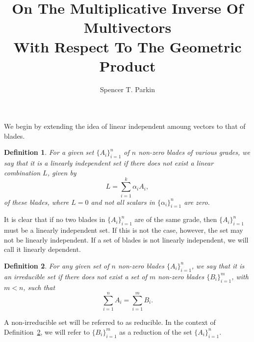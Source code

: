 \documentclass[12pt]{article}
\title{On The Multiplicative Inverse Of Multivectors\\With Respect To The Geometric Product}
\author{Spencer T. Parkin}
\newtheorem{definition}{Definition}[section]
\begin{document}
\maketitle

We begin by extending the idea of linear independent amoung vectors to that of blades.
\begin{definition}\label{def_lin_indep_set}
For a given set $\{A_i\}_{i=1}^n$ of $n$ non-zero blades of various grades, we say that it is
a linearly independent set if there does not exist a linear combination $L$, given by
\begin{equation}
L = \sum_{i=1}^k \alpha_iA_i,
\end{equation}
of these blades, where $L=0$ and not all scalars in $\{\alpha_i\}_{i=1}^n$ are zero.
\end{definition}
It is clear that if no two blades in $\{A_i\}_{i=1}^n$ are of the same grade, then
$\{A_i\}_{i=1}^n$ must be a linearly independent set.  If this is not the case, however,
the set may not be linearly independent.  If a set of blades is not linearly independent,
we will call it linearly dependent.
\begin{definition}\label{def_irreducible_set}
For any given set of $n$ non-zero blades $\{A_i\}_{i=1}^n$, we say that it
is an irreducible set if there does not exist a set of $m$ non-zero blades $\{B_i\}_{i=1}^m$,
with $m<n$, such that
\begin{equation}
\sum_{i=1}^n A_i=\sum_{i=1}^m B_i.
\end{equation}
\end{definition}
A non-irreducible set will be referred to as reducible.  In the context
of Definition~\ref{def_irreducible_set}, we will refer to $\{B_i\}_{i=1}^m$
as a reduction of the set $\{A_i\}_{i=1}^n$.
\end{document}
